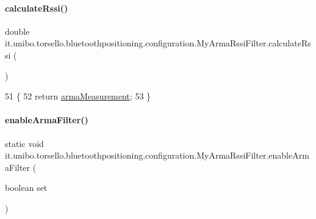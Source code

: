 \paragraph{\texorpdfstring{calculate\+Rssi()}{calculateRssi()}}
{\footnotesize\ttfamily double it.\+unibo.\+torsello.\+bluetoothpositioning.\+configuration.\+My\+Arma\+Rssi\+Filter.\+calculate\+Rssi (\begin{DoxyParamCaption}{ }\end{DoxyParamCaption})}


\begin{DoxyCode}
51                                   \{
52         \textcolor{keywordflow}{return} \hyperlink{classit_1_1unibo_1_1torsello_1_1bluetoothpositioning_1_1configuration_1_1MyArmaRssiFilter_a2be11d7395143321b8f2063afe14a8d0_a2be11d7395143321b8f2063afe14a8d0}{armaMeasurement};
53     \}
\end{DoxyCode}
\hypertarget{classit_1_1unibo_1_1torsello_1_1bluetoothpositioning_1_1configuration_1_1MyArmaRssiFilter_a0ce35b24ad6c6d9abe69e038b3e8da7d_a0ce35b24ad6c6d9abe69e038b3e8da7d}{}\label{classit_1_1unibo_1_1torsello_1_1bluetoothpositioning_1_1configuration_1_1MyArmaRssiFilter_a0ce35b24ad6c6d9abe69e038b3e8da7d_a0ce35b24ad6c6d9abe69e038b3e8da7d} 
\paragraph{\texorpdfstring{enable\+Arma\+Filter()}{enableArmaFilter()}}
{\footnotesize\ttfamily static void it.\+unibo.\+torsello.\+bluetoothpositioning.\+configuration.\+My\+Arma\+Rssi\+Filter.\+enable\+Arma\+Filter (\begin{DoxyParamCaption}\item[{boolean}]{set }\end{DoxyParamCaption})\hspace{0.3cm}{\ttfamily [static]}}


